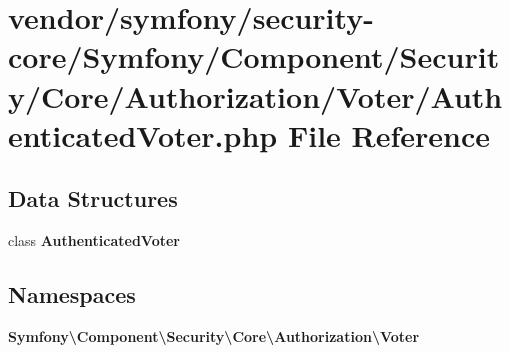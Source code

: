 \section{vendor/symfony/security-\/core/\+Symfony/\+Component/\+Security/\+Core/\+Authorization/\+Voter/\+Authenticated\+Voter.php File Reference}
\label{_authenticated_voter_8php}
\subsection*{Data Structures}
\begin{DoxyCompactItemize}
\item 
class {\bf Authenticated\+Voter}
\end{DoxyCompactItemize}
\subsection*{Namespaces}
\begin{DoxyCompactItemize}
\item 
 {\bf Symfony\textbackslash{}\+Component\textbackslash{}\+Security\textbackslash{}\+Core\textbackslash{}\+Authorization\textbackslash{}\+Voter}
\end{DoxyCompactItemize}
